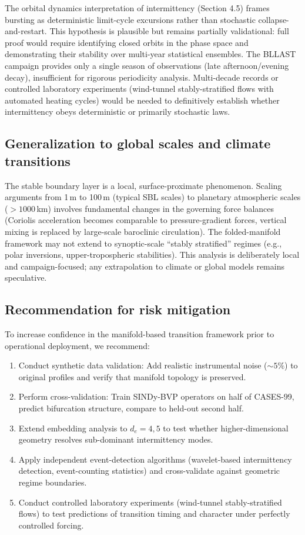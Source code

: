 \documentclass[12pt,a4paper]{article}
\begin{document}
The orbital dynamics interpretation of intermittency (Section 4.5) frames bursting as deterministic limit-cycle excursions rather than stochastic collapse-and-restart. This hypothesis is plausible but remains partially validational: full proof would require identifying closed orbits in the phase space and demonstrating their stability over multi-year statistical ensembles. The BLLAST campaign provides only a single season of observations (late afternoon/evening decay), insufficient for rigorous periodicity analysis. Multi-decade records or controlled laboratory experiments (wind-tunnel stably-stratified flows with automated heating cycles) would be needed to definitively establish whether intermittency obeys deterministic or primarily stochastic laws.

\subsection{Generalization to global scales and climate transitions}

The stable boundary layer is a local, surface-proximate phenomenon. Scaling arguments from 1\,m to 100\,m (typical SBL scales) to planetary atmospheric scales ($>1000$\,km) involves fundamental changes in the governing force balances (Coriolis acceleration becomes comparable to pressure-gradient forces, vertical mixing is replaced by large-scale baroclinic circulation). The folded-manifold framework may not extend to synoptic-scale ``stably stratified'' regimes (e.g., polar inversions, upper-tropospheric stabilities). This analysis is deliberately local and campaign-focused; any extrapolation to climate or global models remains speculative.

\subsection{Recommendation for risk mitigation}

To increase confidence in the manifold-based transition framework prior to operational deployment, we recommend:
\begin{enumerate}
  \item Conduct synthetic data validation: Add realistic instrumental noise ($\sim 5\%$) to original profiles and verify that manifold topology is preserved.
  \item Perform cross-validation: Train SINDy-BVP operators on half of CASES-99, predict bifurcation structure, compare to held-out second half.
  \item Extend embedding analysis to $d_e = 4, 5$ to test whether higher-dimensional geometry resolves sub-dominant intermittency modes.
  \item Apply independent event-detection algorithms (wavelet-based intermittency detection, event-counting statistics) and cross-validate against geometric regime boundaries.
  \item Conduct controlled laboratory experiments (wind-tunnel stably-stratified flows) to test predictions of transition timing and character under perfectly controlled forcing.
\end{enumerate}
\end{document}

